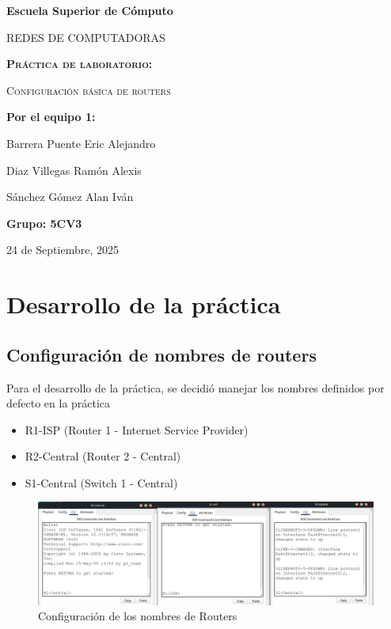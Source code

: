 \documentclass[a4paper,11pt]{article}
\begin{document}
\vspace{0.4cm}

\begin{titlepage}
    \centering
    {\bfseries\LARGE Escuela Superior de Cómputo \par}
    \vspace{1cm}
    {\scshape\Large REDES DE COMPUTADORAS \par}
    \vspace{5cm}
    {\scshape\Huge \textbf{Práctica de laboratorio:} \par}
    {\scshape\Huge Configuración básica de routers \par}
    \vfill
    {\Large \textbf{Por el equipo 1:} \par}
    {\Large Barrera Puente Eric Alejandro \par}
    {\Large Diaz Villegas Ramón Alexis \par}
    {\Large Sánchez Gómez Alan Iván \par}
    \vspace{1cm}
    {\Large \textbf{Grupo: 5CV3} \par}
    \vfill
    {\Large 24 de Septiembre, 2025 \par}
\end{titlepage}

\tableofcontents %
\newpage

\listoffigures
\newpage

\justify
\section{Desarrollo de la práctica}
\subsection{Configuración de nombres de routers}
Para el desarrollo de la práctica, se decidió manejar los nombres definidos por
defecto en la práctica
\begin{itemize}
    \item R1-ISP (Router 1 - Internet Service Provider)
    \item R2-Central (Router 2 - Central)
    \item S1-Central (Switch 1 - Central)
\end{itemize}

\begin{figure}[h]
    \includegraphics[width=1\textwidth]{images/routers/figure1.png}
    \caption{Configuración de los nombres de Routers}
\end{figure}
\end{document}
